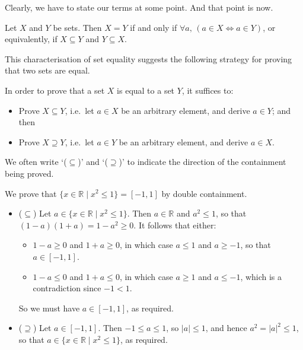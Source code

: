 Clearly, we have to state our terms at some point. And that point is now.

\begin{axiom}
\label{axSetEquality}
Let $X$ and $Y$ be sets. Then $X=Y$ if and only if $\forall a,\, (a \in X \Leftrightarrow a \in Y)$, or equivalently, if $X \subseteq Y$ and $Y \subseteq X$.
\end{axiom}

This characterisation of set equality suggests the following strategy for proving that two sets are equal.

\begin{strategy}
In order to prove that a set $X$ is equal to a set $Y$, it suffices to:
\begin{itemize}
\item Prove $X \subseteq Y$, i.e.\ let $a \in X$ be an arbitrary element, and derive $a \in Y$; and then
\item Prove $X \supseteq Y$, i.e.\ let $a \in Y$ be an arbitrary element, and derive $a \in X$.
\end{itemize}
We often write `($\subseteq$)' and `($\supseteq$)' to indicate the direction of the containment being proved.
\end{strategy}

\begin{example}
\label{exPositiveNegativeSetBuilderNotation}
We prove that $\{ x \in \mathbb{R} \mid x^2 \le 1 \} = [-1,1]$ by double containment.
\begin{itemize}
\item ($\subseteq$) Let $a \in \{ x \in \mathbb{R} \mid x^2 \le 1 \}$. Then $a \in \mathbb{R}$ and $a^2 \le 1$, so that $(1-a)(1+a) = 1-a^2 \ge 0$. It follows that either:
\begin{itemize}
\item $1-a \ge 0$ and $1+a \ge 0$, in which case $a \le 1$ and $a \ge -1$, so that $a \in [-1,1]$.
\item $1-a \le 0$ and $1+a \le 0$, in which case $a \ge 1$ and $a \le -1$, which is a contradiction since $-1 < 1$.
\end{itemize}
So we must have $a \in [-1,1]$, as required.

\item ($\supseteq$) Let $a \in [-1,1]$. Then $-1 \le a \le 1$, so $|a| \le 1$, and hence $a^2 = |a|^2 \le 1$, so that $a \in \{ x \in \mathbb{R} \mid x^2 \le 1 \}$, as required.
\end{itemize}
\end{example}

